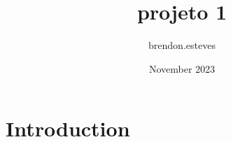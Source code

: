 \documentclass{article}
\title{projeto 1}
\author{brendon.esteves }
\date{November 2023}
\begin{document}
\maketitle

\section{Introduction}
\end{document}
